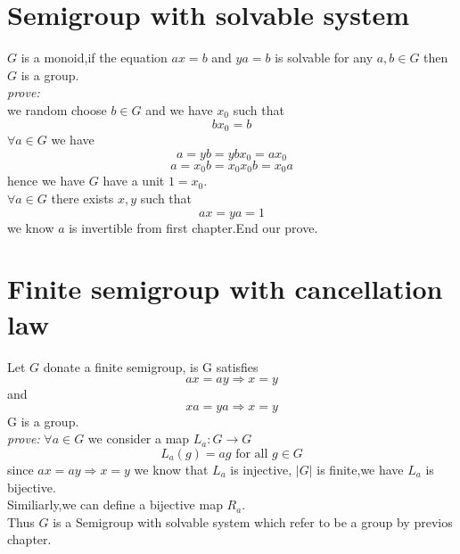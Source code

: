 \documentclass[a4paper,12pt]{article}
\begin{document}
\section{Semigroup with solvable system}
$G$ is a monoid,if the equation $ax=b$ and $ya=b$ is solvable for any $a,b \in G$ then $G$ is a group.\\
\textit{prove:} \\
we random choose $b \in G$ and we have $x_0$ such that
\[ bx_0=b \]
$\forall a \in G$ we have
\[ a = yb = ybx_0 = ax_0 \]
\[ a = x_0 b = x_0 x_0 b = x_0 a\]
hence we have $G$ have a unit $1=x_0$.\\
$\forall a \in G$ there exists $x,y$ such that
\[ ax=ya=1 \]
we know $a$ is invertible from first chapter.End our prove.

\section{Finite semigroup with cancellation law}
Let $G$ donate a finite semigroup, is G satisfies
\[ ax=ay \Rightarrow x=y \]
and
\[ xa=ya \Rightarrow x=y \]
G is a group.\\
\textit{prove:} 
$\forall a \in G$ we consider a map $L_a \colon G \to G$
\[ L_a(g) = ag \mbox{ for all } g \in G \]
since $ ax=ay \Rightarrow x=y $
we know that $L_a$ is injective, $|G|$ is finite,we have $L_a$ is bijective.\\
Similiarly,we can define a bijective map $R_a$.\\
Thus $G$ is a Semigroup with solvable system which refer to be a group by previos chapter.
\end{document}
